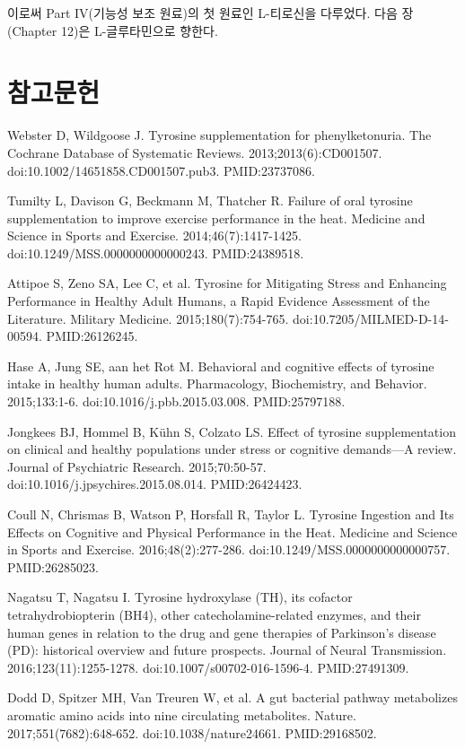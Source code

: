 \documentclass[12pt,oneside]{book}
\newcommand{\refstart}{\par\begingroup\fontsize{8.5pt}{10.2pt}\selectfont\setlength{\parskip}{1.4pt}\raggedright}
\newcommand{\reff}[2]{\par\hangindent=7mm\hangafter=1\noindent[#1]\hspace{2mm}#2\par}
\begin{document}
이로써 Part IV(기능성 보조 원료)의 첫 원료인 L-티로신을 다루었다. 다음 장(Chapter 12)은 L-글루타민으로 향한다.

\section*{참고문헌}

\refstart

\reff{1}{Webster D, Wildgoose J. Tyrosine supplementation for phenylketonuria. The Cochrane Database of Systematic Reviews. 2013;2013(6):CD001507. doi:10.1002/14651858.CD001507.pub3. PMID:23737086.}

\reff{2}{Tumilty L, Davison G, Beckmann M, Thatcher R. Failure of oral tyrosine supplementation to improve exercise performance in the heat. Medicine and Science in Sports and Exercise. 2014;46(7):1417-1425. doi:10.1249/MSS.0000000000000243. PMID:24389518.}

\reff{3}{Attipoe S, Zeno SA, Lee C, et al. Tyrosine for Mitigating Stress and Enhancing Performance in Healthy Adult Humans, a Rapid Evidence Assessment of the Literature. Military Medicine. 2015;180(7):754-765. doi:10.7205/MILMED-D-14-00594. PMID:26126245.}

\reff{4}{Hase A, Jung SE, aan het Rot M. Behavioral and cognitive effects of tyrosine intake in healthy human adults. Pharmacology, Biochemistry, and Behavior. 2015;133:1-6. doi:10.1016/j.pbb.2015.03.008. PMID:25797188.}

\reff{5}{Jongkees BJ, Hommel B, Kühn S, Colzato LS. Effect of tyrosine supplementation on clinical and healthy populations under stress or cognitive demands—A review. Journal of Psychiatric Research. 2015;70:50-57. doi:10.1016/j.jpsychires.2015.08.014. PMID:26424423.}

\reff{6}{Coull N, Chrismas B, Watson P, Horsfall R, Taylor L. Tyrosine Ingestion and Its Effects on Cognitive and Physical Performance in the Heat. Medicine and Science in Sports and Exercise. 2016;48(2):277-286. doi:10.1249/MSS.0000000000000757. PMID:26285023.}

\reff{7}{Nagatsu T, Nagatsu I. Tyrosine hydroxylase (TH), its cofactor tetrahydrobiopterin (BH4), other catecholamine-related enzymes, and their human genes in relation to the drug and gene therapies of Parkinson's disease (PD): historical overview and future prospects. Journal of Neural Transmission. 2016;123(11):1255-1278. doi:10.1007/s00702-016-1596-4. PMID:27491309.}

\reff{8}{Dodd D, Spitzer MH, Van Treuren W, et al. A gut bacterial pathway metabolizes aromatic amino acids into nine circulating metabolites. Nature. 2017;551(7682):648-652. doi:10.1038/nature24661. PMID:29168502.}
\end{document}
